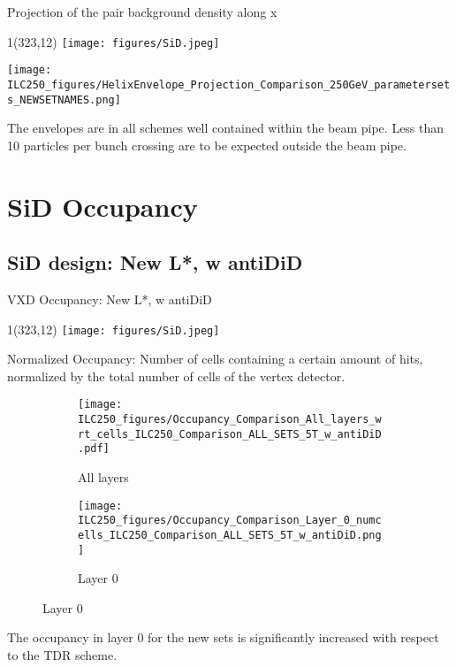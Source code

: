\documentclass[xcolor={dvipsnames}]{beamer}
\newcommand{\sidlogo}{
  \setlength{\TPHorizModule}{1pt}
  \setlength{\TPVertModule}{1pt}
  \begin{textblock}{1}(323,12)
   \texttt{[image: figures/SiD.jpeg]}
  \end{textblock}
  }
\begin{document}
\begin{frame}{Projection of the pair background density along x}
\sidlogo
\begin{center}
 \texttt{[image: ILC250\_figures/HelixEnvelope\_Projection\_Comparison\_250GeV\_parametersets\_NEWSETNAMES.png]}
\end{center}
The envelopes are in all schemes well contained within the beam pipe. Less than 10 particles per bunch crossing are to be expected outside the beam pipe.
\end{frame}

\section{SiD Occupancy}
\subsection{SiD design: New L*, w antiDiD}
\begin{frame}{VXD Occupancy: New L*, w antiDiD}
\sidlogo
\alert{Normalized Occupancy}: Number of cells containing a certain amount of hits, normalized by the total number of cells of the vertex detector.
 \begin{figure}
\centering
\begin{subfigure}[t]{0.48\textwidth}
\centering
\texttt{[image: ILC250\_figures/Occupancy\_Comparison\_All\_layers\_wrt\_cells\_ILC250\_Comparison\_ALL\_SETS\_5T\_w\_antiDiD.pdf]}
\caption{\alert{All layers}}
\end{subfigure}
\hspace*{0.2cm}
\begin{subfigure}[t]{0.48\textwidth}
\centering
 \texttt{[image: ILC250\_figures/Occupancy\_Comparison\_Layer\_0\_numcells\_ILC250\_Comparison\_ALL\_SETS\_5T\_w\_antiDiD.png]}
 \caption{\alert{Layer 0}}
\end{subfigure}
\end{figure}
The occupancy in layer 0 for the new sets is significantly increased with respect to the TDR scheme.
\end{frame}
\end{document}
